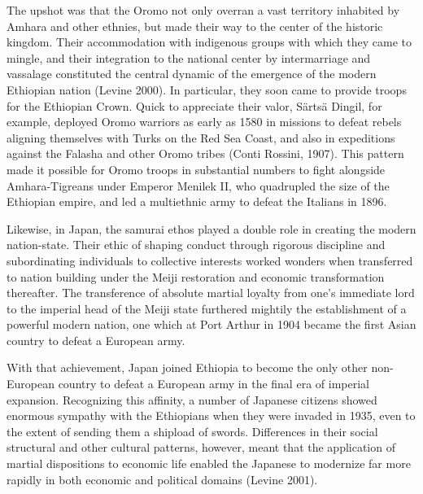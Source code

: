 The upshot was that the Oromo not only overran a vast territory inhabited by Amhara and other ethnies, but made their way to the center of the historic kingdom. Their accommodation with indigenous groups with which they came to mingle, and their integration to the national center by intermarriage and vassalage constituted the central dynamic of the emergence of the modern Ethiopian nation (Levine 2000). In particular, they soon came to provide troops for the Ethiopian Crown. Quick to appreciate their valor, S\"{a}rts\"{a} Dingil, for example, deployed Oromo warriors as early as 1580 in missions to defeat rebels aligning themselves with Turks on the Red Sea Coast, and also in expeditions against the Falasha and other Oromo tribes (Conti Rossini, 1907). This pattern made it possible for Oromo troops in substantial numbers to fight alongside Amhara-Tigreans under Emperor Menilek II, who quadrupled the size of the Ethiopian empire, and led a multiethnic army to defeat the Italians in 1896. 

Likewise, in Japan, the samurai ethos played a double role in creating the modern nation-state. Their ethic of shaping conduct through rigorous discipline and subordinating individuals to collective interests worked wonders when transferred to nation building under the Meiji restoration and economic transformation thereafter. The transference of absolute martial loyalty from one's immediate lord to the imperial head of the Meiji state furthered mightily the establishment of a powerful modern nation, one which at Port Arthur in 1904 became the first Asian country to defeat a European army. 

With that achievement, Japan joined Ethiopia to become the only other non-European country to defeat a European army in the final era of imperial expansion. Recognizing this affinity, a number of Japanese citizens showed enormous sympathy with the Ethiopians when they were invaded in 1935, even to the extent of sending them a shipload of swords. Differences in their social structural and other cultural patterns, however, meant that the application of martial dispositions to economic life enabled the Japanese to modernize far more rapidly in both economic and political domains (Levine 2001).

